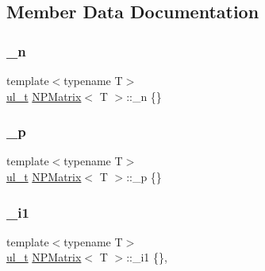 \subsection{Member Data Documentation}
\mbox{\label{class_n_p_matrix_a6ead143a6f35fc3247c26c2442841ba9}} 
\subsubsection{\texorpdfstring{\_n}{\_n}}
{\footnotesize\ttfamily template$<$typename T$>$ \\
\mbox{\hyperlink{typedef_8h_a1b140a2034db3f5dfe18a987745df43a}{ul\+\_\+t}} \mbox{\hyperlink{class_n_p_matrix}{N\+P\+Matrix}}$<$ T $>$\+::\+\_\+n \{\}\hspace{0.3cm}{\ttfamily [protected]}}

\mbox{\label{class_n_p_matrix_aa1571de5d091b0b2e71fd665da3eb7e1}} 
\subsubsection{\texorpdfstring{\_p}{\_p}}
{\footnotesize\ttfamily template$<$typename T$>$ \\
\mbox{\hyperlink{typedef_8h_a1b140a2034db3f5dfe18a987745df43a}{ul\+\_\+t}} \mbox{\hyperlink{class_n_p_matrix}{N\+P\+Matrix}}$<$ T $>$\+::\+\_\+p \{\}\hspace{0.3cm}{\ttfamily [protected]}}

\mbox{\label{class_n_p_matrix_a0cae48bb6660c2d00136ce8600d0fc28}} 
\subsubsection{\texorpdfstring{\_i1}{\_i1}}
{\footnotesize\ttfamily template$<$typename T$>$ \\
\mbox{\hyperlink{typedef_8h_a1b140a2034db3f5dfe18a987745df43a}{ul\+\_\+t}} \mbox{\hyperlink{class_n_p_matrix}{N\+P\+Matrix}}$<$ T $>$\+::\+\_\+i1 \{\}\hspace{0.3cm}{\ttfamily [mutable]}, {\ttfamily [protected]}}

